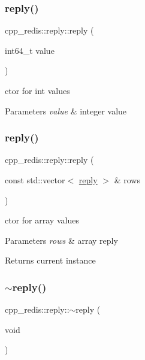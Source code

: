 \subsubsection{\texorpdfstring{reply()}{reply()}\hspace{0.1cm}{\footnotesize\ttfamily [3/5]}}
{\footnotesize\ttfamily cpp\+\_\+redis\+::reply\+::reply (\begin{DoxyParamCaption}\item[{int64\+\_\+t}]{value }\end{DoxyParamCaption})}

ctor for int values


\begin{DoxyParams}{Parameters}
{\em value} & integer value \\
\hline
\end{DoxyParams}
\mbox{\label{classcpp__redis_1_1reply_af3e08b6b795978757a05a1ac4bb08c68}} 
\subsubsection{\texorpdfstring{reply()}{reply()}\hspace{0.1cm}{\footnotesize\ttfamily [4/5]}}
{\footnotesize\ttfamily cpp\+\_\+redis\+::reply\+::reply (\begin{DoxyParamCaption}\item[{const std\+::vector$<$ \hyperlink{classcpp__redis_1_1reply}{reply} $>$ \&}]{rows }\end{DoxyParamCaption})}

ctor for array values


\begin{DoxyParams}{Parameters}
{\em rows} & array reply \\
\hline
\end{DoxyParams}
\begin{DoxyReturn}{Returns}
current instance 
\end{DoxyReturn}
\mbox{\label{classcpp__redis_1_1reply_a1acfe6cbc763368cc2a9eef25afffe35}} 
\subsubsection{\texorpdfstring{$\sim$reply()}{~reply()}}
{\footnotesize\ttfamily cpp\+\_\+redis\+::reply\+::$\sim$reply (\begin{DoxyParamCaption}\item[{void}]{ }\end{DoxyParamCaption})\hspace{0.3cm}{\ttfamily [default]}}



